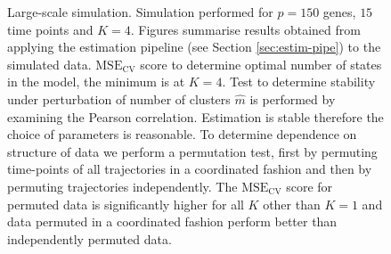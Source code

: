 \begin{figure}
  \centering
  \caption{Large-scale simulation. Simulation performed for $p=150$ genes, $15$ time points and $K=4$. Figures summarise results obtained from applying the estimation pipeline (see Section \ref{sec:estim-pipe}) to the simulated data.  $\mathrm{MSE_{CV}}$ score to determine optimal number of states in the model, the minimum is at $K = 4$.  Test to determine stability under perturbation of number of clusters $\hat{m}$ is performed by examining the Pearson correlation. Estimation is stable therefore the choice of parameters is reasonable.  To determine dependence on structure of data we perform a permutation test, first by permuting time-points of all trajectories in a coordinated fashion and then by permuting trajectories independently. The $\mathrm{MSE_{CV}}$ score for permuted data is significantly higher for all $K$ other than $K=1$ and data permuted in a coordinated fashion perform better than independently permuted data.}
  \label{fig:lrg-sim-k-m}
\end{figure}


